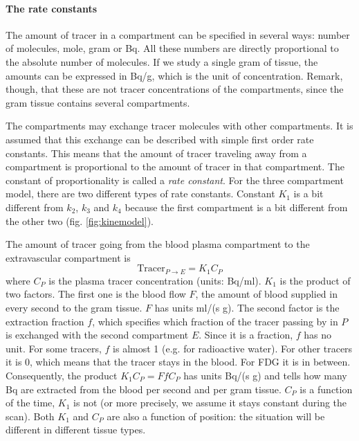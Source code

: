 \documentclass[11pt,oneside]{article}
\begin{document}
\paragraph{The rate constants}
The amount of tracer in a compartment can be specified in several ways: number
of molecules, mole, gram or Bq. All these numbers are directly proportional to
the absolute number of molecules. If we study a single gram of tissue, the
amounts can be expressed in Bq/g, which is the unit of concentration. Remark,
though, that these are not tracer concentrations of the compartments, since the
gram tissue contains several compartments.

The compartments may exchange tracer molecules with other compartments. It is
assumed that this exchange can be described with simple first order rate
constants. This means that the amount of tracer traveling away from a
compartment is proportional to the amount of tracer in that compartment. The
constant of proportionality is called a {\em rate constant}. For the three
compartment model, there are two different types of rate constants. Constant
$K_1$ is a bit different from $k_2$, $k_3$ and $k_4$ because the first
compartment is a bit different from the other two  (fig. \ref{fig:kinemodel}).

The amount of tracer going from the blood plasma compartment to the
extravascular compartment is
\begin{equation}
  \mbox{Tracer}_{P \rightarrow E} = K_1 C_P
\end{equation}
where $C_P$ is the plasma tracer concentration (units: Bq/ml). $K_1$ is the
product of two factors. The first one is the blood flow $F$, the amount of
blood supplied in every second to the gram tissue. $F$ has units ml/(s g).
The second factor is the extraction fraction $f$, which specifies which
fraction of the tracer passing by in $P$ is exchanged with the second
compartment $E$. Since it is a fraction, $f$ has no unit. For some tracers,
$f$ is almost 1 (e.g. for radioactive water). For other tracers it is 0, which
means that the tracer stays in the blood. For FDG it is in
between. Consequently, the product $K_1 C_P = F f C_P$ has units Bq/(s g) and
tells how many Bq are extracted from the blood per second and per gram tissue.
$C_P$ is a function of the time, $K_1$ is not (or more precisely, we assume
it stays constant during the scan). Both $K_1$ and $C_P$ are also a
function of position: the situation will be different in different tissue types.
\end{document}
